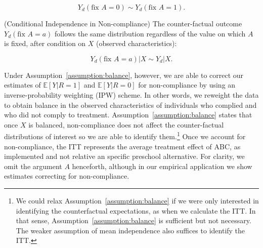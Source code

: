 \begin{equation}
Y_{d} \left(\text{fix } A = 0 \right) \sim Y_{d} \left(\text{fix } A = 1 \right). 
\end{equation}

\begin{assumption} \normalfont \label{assumption:balance} (Conditional Independence in Non-compliance) The counter-factual outcome $Y_{d} \left(\text{fix } A = a \right)$ follows the same distribution regardless of the value on which $A$ is fixed, after condition on $X$ (observed characteristics): 

\begin{equation}
Y_{d} \left(\text{fix } A = a \right) | X \sim Y_{d} | X. 
\end{equation}

\end{assumption}

\noindent Under Assumption~\ref{assumption:balance}, however, we are able to correct our estimates of $\mathbb{E} \left[ Y | R = 1 \right]$ and $\mathbb{E} \left[ Y | R = 0 \right]$ for non-compliance by using an inverse-probability weighting (IPW) scheme. In other words, we reweight the data to obtain balance in the observed characteristics of individuals who complied and who did not comply to treatment. Assumption~\ref{assumption:balance} states that once $X$ is balanced, non-compliance does not affect the counter-factual distributions of interest so we are able to identify them.\footnote{We could relax Assumption~\ref{assumption:balance} if we were only interested in identifying the counterfactual expectations, as when we calculate the ITT. In that sense, Assumption~\ref{assumption:balance} is sufficient but not necessary. The weaker assumption of mean independence also suffices to identify the ITT.} Once we account for non-compliance, the ITT represents the average treatment effect of ABC, as implemented and not relative an specific preschool alternative. For clarity, we omit the argument $A$ henceforth, although in our empirical application we show estimates correcting for non-compliance.\\

